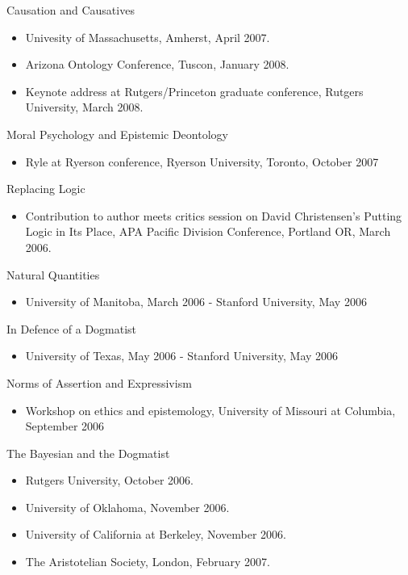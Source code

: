 \documentclass[
  10pt,
  letterpaper,
  DIV=11,
  numbers=noendperiod,
  twoside]{scrartcl}
\providecommand{\tightlist}{%
  \setlength{\itemsep}{0pt}\setlength{\parskip}{0pt}}
\begin{document}
Causation and Causatives

\begin{itemize}
\tightlist
\item
  Univesity of Massachusetts, Amherst, April 2007.
\item
  Arizona Ontology Conference, Tuscon, January 2008.
\item
  Keynote address at Rutgers/Princeton graduate conference, Rutgers
  University, March 2008.
\end{itemize}

Moral Psychology and Epistemic Deontology

\begin{itemize}
\tightlist
\item
  Ryle at Ryerson conference, Ryerson University, Toronto, October 2007
\end{itemize}

Replacing Logic

\begin{itemize}
\tightlist
\item
  Contribution to author meets critics session on David Christensen's
  Putting Logic in Its Place, APA Pacific Division Conference, Portland
  OR, March 2006.
\end{itemize}

Natural Quantities

\begin{itemize}
\tightlist
\item
  University of Manitoba, March 2006 - Stanford University, May 2006
\end{itemize}

In Defence of a Dogmatist

\begin{itemize}
\tightlist
\item
  University of Texas, May 2006 - Stanford University, May 2006
\end{itemize}

Norms of Assertion and Expressivism

\begin{itemize}
\tightlist
\item
  Workshop on ethics and epistemology, University of Missouri at
  Columbia, September 2006
\end{itemize}

The Bayesian and the Dogmatist

\begin{itemize}
\tightlist
\item
  Rutgers University, October 2006.
\item
  University of Oklahoma, November 2006.
\item
  University of California at Berkeley, November 2006.
\item
  The Aristotelian Society, London, February 2007.
\end{itemize}
\end{document}
